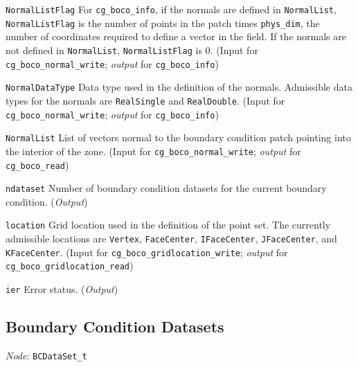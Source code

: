 \begin{Ventryi}{\texttt{NormalListFlag}}
      For \texttt{cg\_boco\_info}, if the normals are defined in
      \texttt{NormalList}, \texttt{NormalListFlag} is the number of points
      in the patch times \texttt{phys\_dim}, the number of coordinates
      required to define a vector in the field.
      If the normals are not defined in \texttt{NormalList},
      \texttt{NormalListFlag} is 0.
      (\textcolor{input}{Input} for \texttt{cg\_boco\_normal\_write};
      \textcolor{output}{\textit{output}} for \texttt{cg\_boco\_info})
\item [\texttt{NormalDataType}]
      Data type used in the definition of the normals.
      Admissible data types for the normals are \texttt{RealSingle} and
      \texttt{RealDouble}.
      (\textcolor{input}{Input} for \texttt{cg\_boco\_normal\_write};
      \textcolor{output}{\textit{output}} for \texttt{cg\_boco\_info})
\item [\texttt{NormalList}]
      List of vectors normal to the boundary condition patch pointing
      into the interior of the zone.
      (\textcolor{input}{Input} for \texttt{cg\_boco\_normal\_write};
      \textcolor{output}{\textit{output}} for \texttt{cg\_boco\_read})
\item [\texttt{ndataset}]
      Number of boundary condition datasets for the current boundary
      condition.
      (\textcolor{output}{\textit{Output}})
\item [\texttt{location}]
      Grid location used in the definition of the point set.
      The currently admissible locations are \texttt{Vertex},
      \texttt{FaceCenter}, \texttt{IFaceCenter},
      \texttt{JFaceCenter}, and \texttt{KFaceCenter}.
      (\textcolor{input}{Input} for \texttt{cg\_boco\_gridlocation\_write};
      \textcolor{output}{\textit{output}} for
      \texttt{cg\_boco\_gridlocation\_read})
\item [\texttt{ier}]
      Error status.
      (\textcolor{output}{\textit{Output}})
\end{Ventryi}

\subsection{Boundary Condition Datasets}
\label{s:bcdataset}

\noindent
\textit{Node}: \texttt{BCDataSet\_t}

